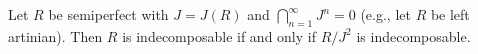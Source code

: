 Let $R$ be semiperfect with $J = J(R)$ and $\bigcap_{n=1}^{\infty} J^n = 0$ (e.g., let $R$ be left artinian). Then $R$ is indecomposable if and only if $R/J^2$ is indecomposable.
